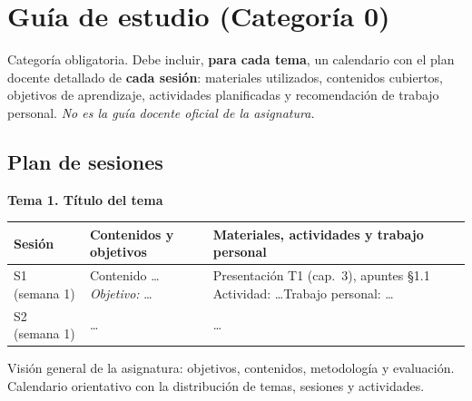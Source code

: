 \chapter{Guía de estudio (Categoría 0)}

\begin{introcategoria}
Categoría obligatoria. Debe incluir, \textbf{para cada tema}, un calendario con el plan
docente detallado de \textbf{cada sesión}: materiales utilizados, contenidos cubiertos,
objetivos de aprendizaje, actividades planificadas y recomendación de trabajo personal.
\emph{No es la guía docente oficial de la asignatura.}
\end{introcategoria}

\section{Plan de sesiones}

\noindent\textbf{Tema 1. Título del tema}\\[4pt]
\begin{tabularx}{\textwidth}{@{}l X X@{}}
\toprule
\textbf{Sesión} & \textbf{Contenidos y objetivos} & \textbf{Materiales, actividades y trabajo personal}\\
\midrule
S1 (semana 1) & Contenido \ldots \newline \emph{Objetivo:} \ldots & Presentación T1 (cap.~3), apuntes \S1.1 \newline Actividad: \ldots \newline Trabajo personal: \ldots\\
S2 (semana 1) & \ldots & \ldots\\
\bottomrule
\end{tabularx}

  {Visión general de la asignatura: objetivos, contenidos, metodología y evaluación.}
  {Calendario orientativo con la distribución de temas, sesiones y actividades.}
